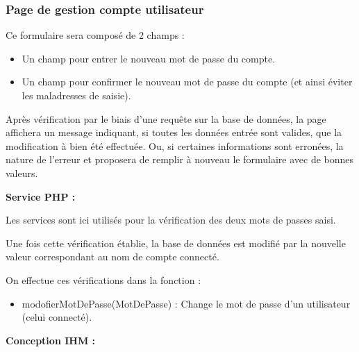 		\subsubsection{Page de gestion compte utilisateur}

			\begin{paragraphe}
				Ce formulaire sera composé de 2 champs :
				\begin{itemize}
					\item Un champ pour entrer le nouveau mot de passe du compte.
					\item Un champ pour confirmer le nouveau mot de passe du compte (et ainsi éviter les maladresses de saisie).
				\end{itemize}
			\end{paragraphe}

			\begin{paragraphe}
				Après vérification par le biais d'une requête sur la base de données, la page affichera un message indiquant, si toutes les données entrée sont valides, que la modification à bien été effectuée. Ou, si certaines informations sont erronées, la nature de l'erreur et proposera de remplir à nouveau le formulaire avec de bonnes valeurs.
			\end{paragraphe}

			\begin{paragraphe}
				\textbf{Service PHP :}
			\end{paragraphe}

			\begin{paragraphe}
				Les services sont ici utilisés pour la vérification des deux mots de passes saisi.\par
				Une fois cette vérification établie, la base de données est modifié par la nouvelle valeur correspondant au nom de compte connecté.
			\end{paragraphe}

			\begin{paragraphe}
				On effectue ces vérifications dans la fonction :
				\begin{itemize}
					\item modofierMotDePasse(MotDePasse) : Change le mot de passe d'un utilisateur (celui connecté).
				\end{itemize}
			\end{paragraphe}

			\begin{paragraphe}
				\textbf{Conception IHM :}
			\end{paragraphe}

